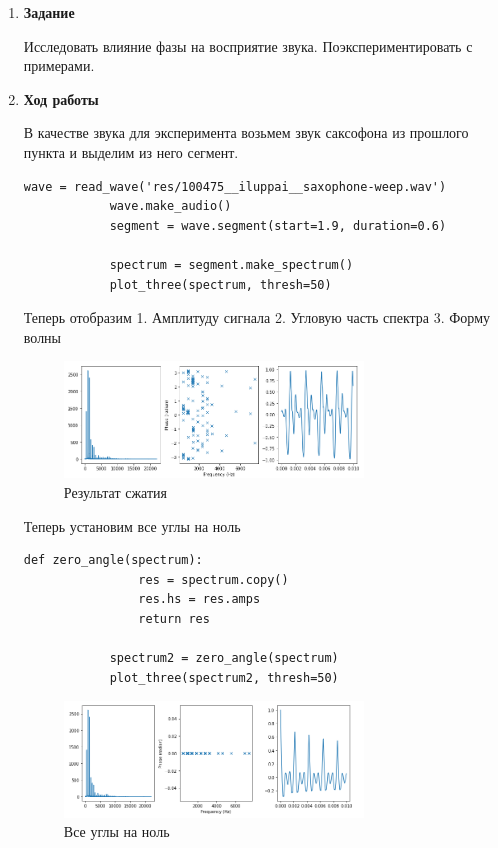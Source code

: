 \documentclass[a4paper,12pt]{article}
\begin{document}
	\begin{enumerate} 
				
		\item \textbf{Задание}
				
		Исследовать влияние фазы на восприятие звука. Поэкспериментировать с примерами.
				
		\item \textbf{Ход работы}
				
		В качестве звука для эксперимента возьмем звук саксофона из прошлого пункта и выделим из него сегмент.
		\begin{lstlisting}[caption=Сегмент звука саксофона]
			wave = read_wave('res/100475__iluppai__saxophone-weep.wav')
			wave.make_audio()
			segment = wave.segment(start=1.9, duration=0.6)
			
			spectrum = segment.make_spectrum()
			plot_three(spectrum, thresh=50)
		\end{lstlisting}
		
		Теперь отобразим
		1. Амплитуду сигнала
		2. Угловую часть спектра
		3. Форму волны
		
		\begin{figure}[H]
			\centering
			\includegraphics[width=0.75\textwidth]{3_1.png}
			\caption{Результат сжатия}
			\label{fig:3.1}
		\end{figure}	
		
		Теперь установим все углы на ноль
		\begin{lstlisting}[caption=Все углы на ноль]
			def zero_angle(spectrum):
				res = spectrum.copy()
				res.hs = res.amps
				return res
			
			spectrum2 = zero_angle(spectrum)
			plot_three(spectrum2, thresh=50)
		\end{lstlisting}
		\begin{figure}[H]
			\centering
			\includegraphics[width=0.75\textwidth]{3_2.png}
			\caption{Все углы на ноль}
			\label{fig:3.2}
		\end{figure}
		

\end{enumerate}
\end{document}
